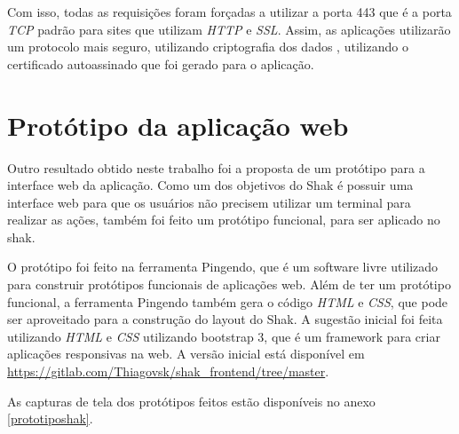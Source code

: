 Com isso, todas as requisições foram forçadas a utilizar a porta 443 que é a porta
\textit{TCP} padrão para sites que utilizam \textit{HTTP} e \textit{SSL}. Assim, 
as aplicações utilizarão um protocolo mais seguro, utilizando criptografia dos dados
, utilizando o certificado autoassinado que foi gerado para o aplicação.

\section{Protótipo da aplicação web}
\label{sub:prototipo}

Outro resultado obtido neste trabalho foi a proposta de um protótipo para a interface
web da aplicação. Como um dos objetivos do Shak é possuir uma interface web para que
os usuários não precisem utilizar um terminal para realizar as ações, também foi
feito um protótipo funcional, para ser aplicado no shak. 

O protótipo foi feito
na ferramenta Pingendo, que é um software livre utilizado para construir
protótipos funcionais de aplicações web. Além de ter um protótipo funcional, a 
ferramenta Pingendo
também gera o código \textit{HTML} e \textit{CSS}, que pode ser aproveitado para 
a construção do layout do Shak. A sugestão inicial foi feita utilizando \textit{HTML} e \textit{CSS} utilizando bootstrap 3, que é um framework para criar aplicações responsivas 
na web. A versão inicial está disponível em 
\url{https://gitlab.com/Thiagovsk/shak_frontend/tree/master}.

As capturas de tela dos protótipos feitos estão disponíveis no anexo \ref{prototiposhak}.
